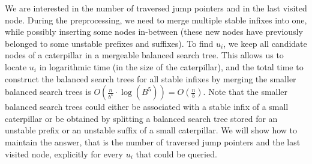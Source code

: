 \documentclass[a4paper,UKenglish]{lipics-v2016}
\theoremstyle{plain}
\begin{document}
We are interested in the number of traversed jump pointers and in the last visited node.
During the preprocessing, we need to merge multiple stable infixes
into one, while possibly inserting some nodes in-between (these new nodes have previously
belonged to some unstable prefixes and suffixes). To find $u_{i}$, we keep all candidate
nodes of a caterpillar in a mergeable balanced search tree. This allows us to locate $u_{i}$
in logarithmic time (in the size of the caterpillar), and the total time to construct the balanced
search trees for all stable infixes by merging the smaller balanced search trees
is $O(\frac{n}{b^{4}}\cdot \log (B^{5}))=O(\frac{n}{b})$. Note that the smaller balanced search
trees could either be associated with a stable infix of a small caterpillar or be obtained
by splitting a balanced search tree stored for an unstable prefix or an unstable suffix of
a small caterpillar.
We will show how to maintain the answer, that is the number of traversed jump pointers and the
last visited node, explicitly for every $u_{i}$ that could be queried.
\end{document}
